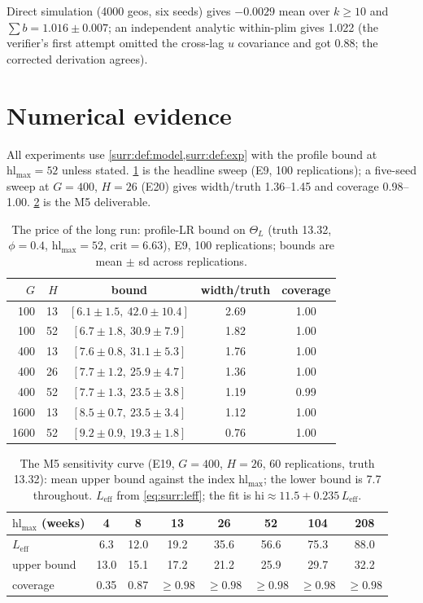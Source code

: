 Direct simulation (4000 geos, six seeds) gives $-0.0029$ mean over $k \ge 10$ and $\sum b = 1.016 \pm 0.007$; an independent analytic within-plim gives 1.022 (the verifier's first attempt omitted the cross-lag $u$ covariance and got 0.88; the corrected derivation agrees).

\section{Numerical evidence}
\label{surr:sec:numerics}

All experiments use \cref{surr:def:model,surr:def:exp} with the profile bound at $\mathrm{hl}_{\max} = 52$ unless stated. \cref{surr:tab:price} is the headline sweep (E9, 100 replications); a five-seed sweep at $G = 400$, $H = 26$ (E20) gives width/truth 1.36--1.45 and coverage 0.98--1.00. \cref{surr:tab:curve} is the M5 deliverable.

\begin{table}[htbp]
\centering\small
\caption{The price of the long run: profile-LR bound on $\Theta_L$ (truth 13.32, $\phi = 0.4$, $\mathrm{hl}_{\max} = 52$, $\mathrm{crit} = 6.63$), E9, 100 replications; bounds are mean $\pm$ sd across replications.}
\label{surr:tab:price}
\begin{tabular}{rrccc}
\toprule
$G$ & $H$ & bound & width/truth & coverage \\
\midrule
100 & 13 & $[6.1 \pm 1.5,\ 42.0 \pm 10.4]$ & 2.69 & 1.00 \\
100 & 52 & $[6.7 \pm 1.8,\ 30.9 \pm 7.9]$ & 1.82 & 1.00 \\
400 & 13 & $[7.6 \pm 0.8,\ 31.1 \pm 5.3]$ & 1.76 & 1.00 \\
400 & 26 & $[7.7 \pm 1.2,\ 25.9 \pm 4.7]$ & 1.36 & 1.00 \\
400 & 52 & $[7.7 \pm 1.3,\ 23.5 \pm 3.8]$ & 1.19 & 0.99 \\
1600 & 13 & $[8.5 \pm 0.7,\ 23.5 \pm 3.4]$ & 1.12 & 1.00 \\
1600 & 52 & $[9.2 \pm 0.9,\ 19.3 \pm 1.8]$ & 0.76 & 1.00 \\
\bottomrule
\end{tabular}
\end{table}

\begin{table}[htbp]
\centering\small
\caption{The M5 sensitivity curve (E19, $G = 400$, $H = 26$, 60 replications, truth 13.32): mean upper bound against the index $\mathrm{hl}_{\max}$; the lower bound is 7.7 throughout. $L_{\mathrm{eff}}$ from \cref{eq:surr:leff}; the fit is $\mathrm{hi} \approx 11.5 + 0.235\,L_{\mathrm{eff}}$.}
\label{surr:tab:curve}
\begin{tabular}{lccccccc}
\toprule
$\mathrm{hl}_{\max}$ (weeks) & 4 & 8 & 13 & 26 & 52 & 104 & 208 \\
\midrule
$L_{\mathrm{eff}}$ & 6.3 & 12.0 & 19.2 & 35.6 & 56.6 & 75.3 & 88.0 \\
upper bound & 13.0 & 15.1 & 17.2 & 21.2 & 25.9 & 29.7 & 32.2 \\
coverage & 0.35 & 0.87 & $\ge 0.98$ & $\ge 0.98$ & $\ge 0.98$ & $\ge 0.98$ & $\ge 0.98$ \\
\bottomrule
\end{tabular}
\end{table}

